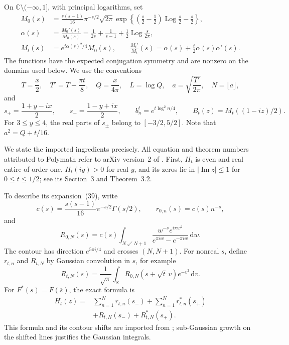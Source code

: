 \documentclass[11pt]{article}
\theoremstyle{remark}
\newcommand{\R}{\mathbb R}
\newcommand{\C}{\mathbb C}
\newcommand{\dd}{\,\mathrm d}
\numberwithin{equation}{section}
\begin{document}
On $\C\setminus(-\infty,1]$, with principal logarithms, set
\begin{align}
 M_0(s)&=\frac{s(s-1)}{16}\pi^{-s/2}\sqrt{2\pi}
   \exp\left\{\left(\frac s2-\frac12\right)
                        \operatorname{Log}\frac s2-\frac s2\right\},
   \label{eq:M0}\\
 \alpha(s)&=\frac{M_0'(s)}{M_0(s)}
   =\frac1{2s}+\frac1{s-1}+\frac12\operatorname{Log}\frac{s}{2\pi},
   \label{eq:alpha}\\
 M_t(s)&=e^{t\alpha(s)^2/4}M_0(s),\qquad
 \frac{M_t'}{M_t}(s)=\alpha(s)+\frac t2\alpha(s)\alpha'(s).
   \label{eq:Mt}
\end{align}
The functions have the expected conjugation symmetry and are nonzero
on the domains used below. We use the conventions
\begin{equation}\label{eq:parameters}
 T=\frac x2,\quad T'=T+\frac{\pi t}{8},\quad
 Q=\frac{x}{4\pi},\quad L=\log Q,\quad
 a=\sqrt{\frac{T'}{2\pi}},\quad N=\lfloor a\rfloor,
\end{equation}
and
\begin{equation}\label{eq:branches}
 s_+=\frac{1+y-ix}{2},\qquad s_-=\frac{1-y+ix}{2},\qquad
 b_n^t=e^{t\log^2 n/4},\qquad B_t(z)=M_t((1-iz)/2).
\end{equation}
For $3\le y\le4$, the real parts of $s_\pm$ belong to
$[-3/2,5/2]$. Note that $a^2=Q+t/16$.

We state the imported ingredients precisely. All equation and theorem
numbers attributed to Polymath refer to arXiv version~2 of
\cite{polymath}. First, $H_t$ is even and real entire of order one,
$H_t(iy)>0$ for real $y$, and its zeros lie in $|\operatorname{Im}z|\le1$
for $0\le t\le1/2$; see its Section~3 and Theorem~3.2.

To describe its expansion~(39), write
\[
 c(s)=\frac{s(s-1)}{16}\pi^{-s/2}\Gamma(s/2),\qquad
 r_{0,n}(s)=c(s)n^{-s},
\]
and
\[
 R_{0,N}(s)=c(s)\int_{N\swarrow N+1}
       \frac{w^{-s}e^{i\pi w^2}}{e^{\pi iw}-e^{-\pi iw}}\dd w.
\]
The contour has direction $e^{5\pi i/4}$ and crosses $(N,N+1)$.
For nonreal $s$, define $r_{t,n}$ and $R_{t,N}$ by Gaussian convolution
in $s$, for example
\begin{equation}\label{eq:Rheat}
 R_{t,N}(s)=\frac1{\sqrt\pi}\int_\R
                  R_{0,N}(s+\sqrt t\,v)e^{-v^2}\dd v.
\end{equation}
For $F^*(s)=\overline{F(\overline s)}$, the exact formula is
\begin{equation}\label{eq:exact-expansion}
 \begin{split}
 H_t(z)={}&\sum_{n=1}^N r_{t,n}(s_-)
          +\sum_{n=1}^N r_{t,n}^*(s_+)\\
          &+R_{t,N}(s_-)+R_{t,N}^*(s_+).
 \end{split}
\end{equation}
This formula and its contour shifts are imported from
\cite[(39)--(41)]{polymath}; sub-Gaussian growth on the shifted lines
justifies the Gaussian integrals.
\end{document}
